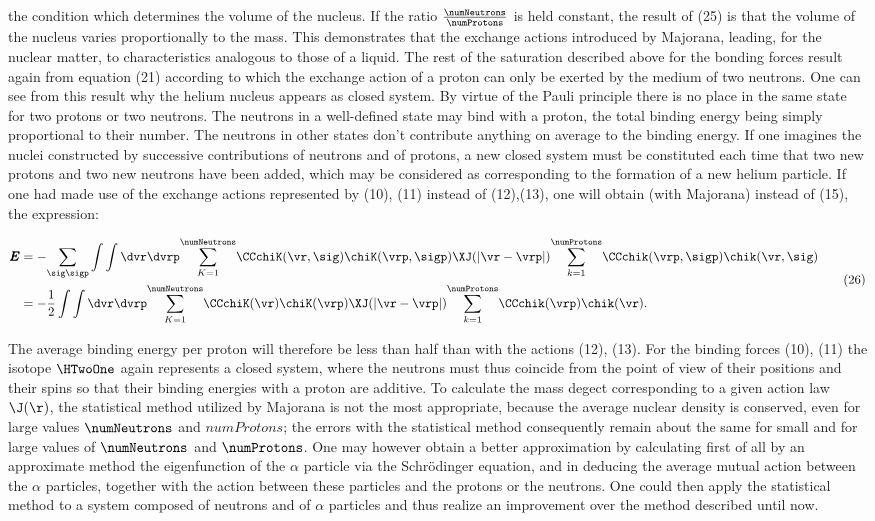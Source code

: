 \documentclass{article}
\newcommand{\var}[1]{\pmb{#1}}
\newcommand{\E}{\var{E}}
\newcommand{\ser}[2]{\underset{#1}{\sum} #2 }
\newcommand{\serXY}[3]{\underset{#1}{\overset{#2}{\sum}} #3}
\newcommand{\nequ}[2]{
\begin{equation*}
#1
\tag{#2}
\end{equation*}
}
\begin{document}
the condition which determines the volume of the nucleus. If the ratio $\frac{\numNeutrons}{\numProtons}$ is held constant, the result of (25) is that the volume of the nucleus varies proportionally to the mass. This demonstrates that the exchange actions introduced by Majorana, leading, for the nuclear matter, to characteristics analogous to those of a liquid. The rest of the saturation described above for the bonding forces result again from equation (21) according to which the exchange action of a proton can only be exerted by the medium of two neutrons.
One can see from this result why the helium nucleus appears as closed system. By virtue of the Pauli principle there is no place in the same state for two protons or two neutrons. The neutrons in a well-defined state may bind with a proton, the total binding energy being simply proportional to their number. The neutrons in other states don't contribute anything on average to the binding energy. If one imagines the nuclei constructed by successive contributions of neutrons and of protons, a new closed system must be constituted each time that two new protons and two new neutrons have been added, which may be considered as corresponding to the formation of a new helium particle.
If one had made use of the exchange actions represented by (10), (11) instead of (12),(13), one will obtain (with Majorana) instead of (15), the expression:

\nequ{
\begin{split}
\E &= -\ser{\sig\sigp}{
  \int\int\dvr\dvrp
    \serXY{K=1}{\numNeutrons}{
      \CCchiK(\vr, \sig)\chiK(\vrp, \sigp)
      \XJ(|\vr - \vrp|)
    }
    \serXY{k=1}{\numProtons}{
      \CCchik(\vrp, \sigp)
      \chik(\vr, \sig)
    }
} \\
&= -\frac{1}{2}
  \int\int\dvr\dvrp
    \serXY{K=1}{\numNeutrons}{
      \CCchiK(\vr)\chiK(\vrp)
      \XJ(|\vr - \vrp|)
    }
    \serXY{k=1}{\numProtons}{
      \CCchik(\vrp)
      \chik(\vr)
    }.
\end{split}
}{26}

The average binding energy per proton will therefore be less than half than with the actions (12), (13). For the binding forces (10), (11) the isotope $\HTwoOne$ again represents a closed system, where the neutrons must thus coincide from the point of view of their positions and their spins so that their binding energies with a proton are additive.
To calculate the mass degect corresponding to a given action law $\J(\r)$, the statistical method utilized by Majorana is not the most appropriate, because the average nuclear density is conserved, even for large values $\numNeutrons$ and $numProtons$; the errors with the statistical method consequently remain about the same for small and for large values of $\numNeutrons$ and $\numProtons$. One may however obtain a better approximation by calculating first of all by an approximate method the eigenfunction of the $\alpha$ particle via the Schrödinger equation, and in deducing the average mutual action between the $\alpha$ particles, together with the action between these particles and the protons or the neutrons. One could then apply the statistical method to a system composed of neutrons and of $\alpha$ particles and thus realize an improvement over the method described until now.
\end{document}
